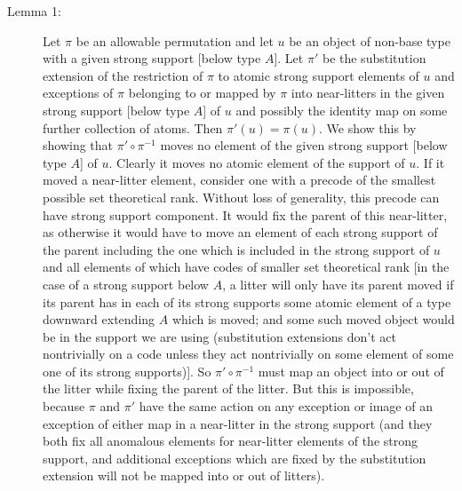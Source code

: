\documentclass{article}
\begin{document}
\begin{description}

\item[Lemma 1:]  Let $\pi$ be an allowable permutation and let $u$ be an object of non-base type with a given strong support [below type $A$].  Let $\pi'$ be the substitution extension of the restriction of $\pi$ to atomic strong support elements of $u$
and exceptions of $\pi$ belonging to or mapped by $\pi$ into near-litters in the given strong support [below type $A$] of $u$ and possibly the identity map on some further collection of atoms.  Then $\pi'(u)=\pi(u)$.    We show this by showing that $\pi' \circ \pi^{-1}$ moves no element of the given strong support [below type $A$] of $u$.   Clearly it moves no atomic element of the support of $u$.  If it moved a near-litter element, consider one with a precode of the smallest possible set theoretical rank.  Without loss of generality, this precode can have strong support component.  It would fix
the parent of this near-litter, as otherwise it would have to move an element of each strong support of the parent including the one which is included in the strong support of $u$ and all elements of which have codes of smaller set theoretical rank [in the case of a strong support below $A$, a litter will only have its parent moved if its parent has in each of its strong supports some atomic element of a type downward extending $A$ which is moved; and some such moved object would be in the support we are using (substitution extensions don't act nontrivially on a code unless they act nontrivially on some element of some one of its strong supports)].    So $\pi' \circ \pi^{-1}$ must map an object into or out of the litter while fixing the parent of the litter.   But this is impossible, because $\pi$ and $\pi'$ have the same
action on any exception or image of an exception of either map in a near-litter in the strong support (and they both fix all anomalous elements for near-litter elements of the strong support, and additional exceptions which are fixed by the substitution extension will not be mapped into or out of litters).


\end{description}
\end{document}
